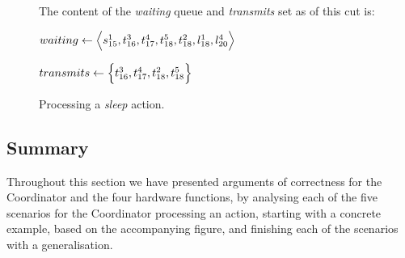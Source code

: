 \begin{figure}[H]
    \caption{Processing a \textit{sleep} action.}\label{tikz:coordinatormsc5}
     \par

    \begin{minipage}[h]{14.5cm}
        The content of the \textit{waiting} queue and \textit{transmits} set as of this cut is: \smallbreak

        $waiting \leftarrow \Big\langle s^{1}_{15}, t^{3}_{16}, t^{4}_{17}, t^{5}_{18}, t^{2}_{18}, l^{1}_{18},
            l^{4}_{20} \Big\rangle$

        $transmits \leftarrow \Big\{ t^{3}_{16}, t^{4}_{17}, t^{2}_{18}, t^{5}_{18} \Big\}$
    \end{minipage}
\end{figure}

\subsection{Summary}\label{sec:summary}
Throughout this section we have presented arguments of correctness for the Coordinator and the four hardware
functions, by analysing each of the five scenarios for the Coordinator processing an action, starting with a
concrete example, based on the accompanying figure, and finishing each of the scenarios with a generalisation.
